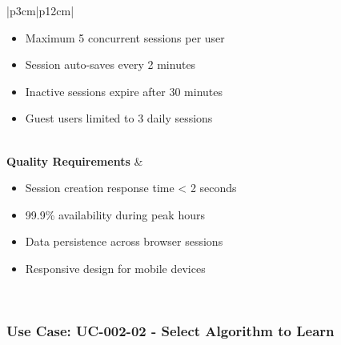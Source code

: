 \documentclass[12pt,a4paper]{article}
\begin{document}
\begin{longtable}{|p{3cm}|p{12cm}|}
\begin{minipage}[t]{\linewidth}
\begin{itemize}[leftmargin=*,noitemsep,topsep=0pt]
    \item Maximum 5 concurrent sessions per user
    \item Session auto-saves every 2 minutes
    \item Inactive sessions expire after 30 minutes
    \item Guest users limited to 3 daily sessions
\end{itemize}
\end{minipage} \\
\hline
\textbf{Quality Requirements} & 
\begin{minipage}[t]{\linewidth}
\begin{itemize}[leftmargin=*,noitemsep,topsep=0pt]
    \item Session creation response time < 2 seconds
    \item 99.9\% availability during peak hours
    \item Data persistence across browser sessions
    \item Responsive design for mobile devices
\end{itemize}
\end{minipage} \\
\hline
\end{longtable}

\subsubsection{Use Case: UC-002-02 - Select Algorithm to Learn}
\end{document}
